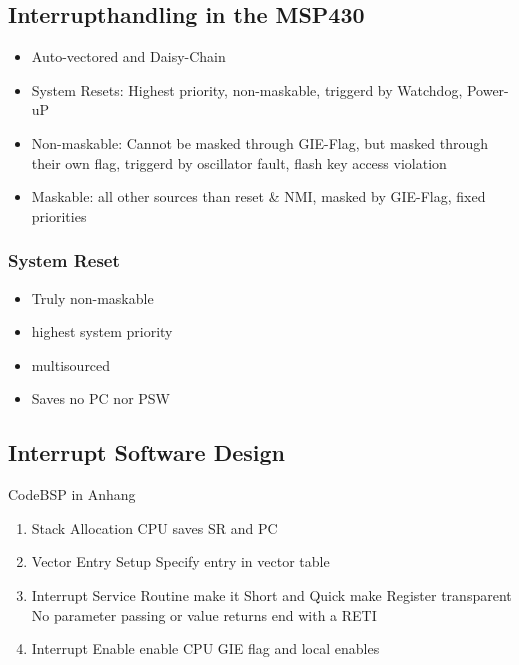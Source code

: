 \subsection{Interrupthandling in the MSP430 }
\begin{itemize}
    \item Auto-vectored and Daisy-Chain
    \item System Resets: Highest priority, non-maskable, triggerd by Watchdog, Power-uP
    \item Non-maskable: Cannot be masked through \acs{GIE}-Flag, but masked through their own flag, triggerd by oscillator fault, flash key access violation
    \item Maskable: all other sources than reset \& \acs{NMI}, masked by \acs{GIE}-Flag, fixed priorities
\end{itemize}
\subsubsection{System Reset}
    \begin{itemize}
        \item Truly non-maskable
        \item highest system priority
        \item multisourced
        \item Saves no \acs{PC} nor \acs{PSW}
    \end{itemize}

\subsection{Interrupt Software Design }
    CodeBSP in Anhang \label{InterruptC}
    \begin{enumerate}
        \item Stack Allocation\newline
            \acs{CPU} saves \acs{SR} and \acs{PC}
        \item Vector Entry Setup\newline
            Specify entry in vector table 
        \item Interrupt Service Routine\newline
            make it Short and Quick\newline
            make Register transparent \newline
            No parameter passing or value returns\newline
            end with a \acs{RETI}
        \item Interrupt Enable\newline
            enable \acs{CPU} \acs{GIE} flag and local enables
    \end{enumerate}
\clearpage

